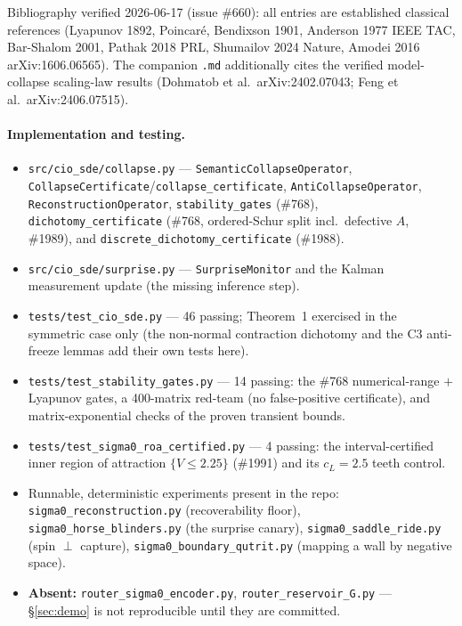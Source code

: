 \documentclass[11pt]{article}
\theoremstyle{definition}
\begin{document}
\begin{caveatbox}
Bibliography verified 2026-06-17 (issue \#660): all entries are established
classical references (Lyapunov 1892, Poincar\'e, Bendixson 1901, Anderson 1977
IEEE TAC, Bar-Shalom 2001, Pathak 2018 PRL, Shumailov 2024 Nature, Amodei 2016
arXiv:1606.06565). The companion \texttt{.md} additionally cites the verified
model-collapse scaling-law results (Dohmatob et al.\ arXiv:2402.07043; Feng et al.\
arXiv:2406.07515).
\end{caveatbox}

\paragraph{Implementation and testing.}
\begin{itemize}
\item \texttt{src/\allowbreak cio\_sde/\allowbreak collapse.py} --- \texttt{Semantic\allowbreak Collapse\allowbreak Operator},
  \texttt{Collapse\allowbreak Certificate}/\allowbreak\texttt{collapse\_\allowbreak certificate}, \texttt{Anti\allowbreak Collapse\allowbreak Operator},
  \texttt{Reconstruction\allowbreak Operator}, \texttt{stability\_\allowbreak gates} (\#768),
  \texttt{dichotomy\_\allowbreak certificate} (\#768, ordered-Schur split incl.\ defective $A$, \#1989),
  and \texttt{discrete\_\allowbreak dichotomy\_\allowbreak certificate} (\#1988).
\item \texttt{src/\allowbreak cio\_sde/\allowbreak surprise.py} --- \texttt{SurpriseMonitor} and the Kalman
  measurement update (the missing inference step).
\item \texttt{tests/\allowbreak test\_cio\_sde.py} --- 46 passing; Theorem~1
  exercised in the symmetric case only (the non-normal contraction dichotomy and the C3
  anti-freeze lemmas add their own tests here).
\item \texttt{tests/\allowbreak test\_stability\_gates.py} --- 14 passing: the \#768 numerical-range
  $+$ Lyapunov gates, a 400-matrix red-team (no false-positive certificate), and
  matrix-exponential checks of the proven transient bounds.
\item \texttt{tests/\allowbreak test\_sigma0\_\allowbreak roa\_\allowbreak certified.py} --- 4 passing:
  the interval-certified inner region of attraction $\{V\le2.25\}$ (\#1991) and its $c_L=2.5$
  teeth control.
\item Runnable, deterministic experiments present in the repo:
  \texttt{sigma0\_\allowbreak reconstruction.py} (recoverability floor),
  \texttt{sigma0\_\allowbreak horse\_\allowbreak blinders.py} (the surprise canary),
  \texttt{sigma0\_\allowbreak saddle\_\allowbreak ride.py} (spin $\perp$ capture),
  \texttt{sigma0\_\allowbreak boundary\_\allowbreak qutrit.py} (mapping a wall by negative space).
\item \textbf{Absent:} \texttt{router\_\allowbreak sigma0\_\allowbreak encoder.py},
  \texttt{router\_\allowbreak reservoir\_\allowbreak G.py} --- \S\ref{sec:demo} is not reproducible until
  they are committed.
\end{itemize}
\end{document}
